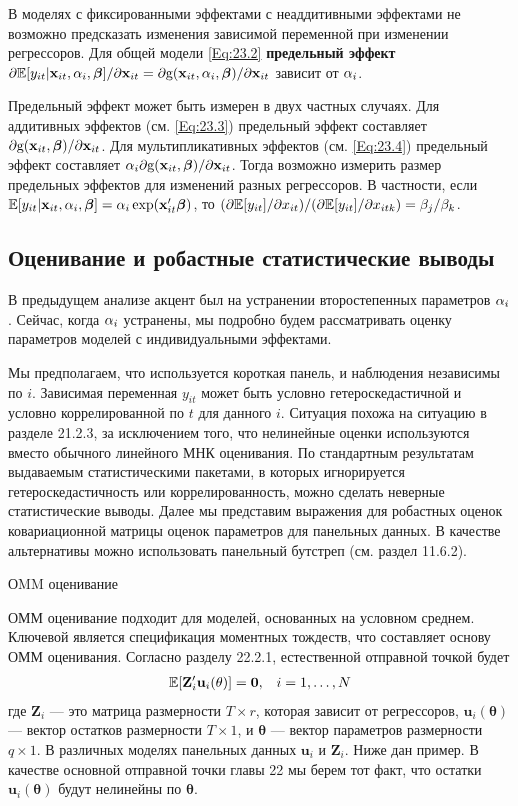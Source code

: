 В моделях с фиксированными эффектами с неаддитивными эффектами  не возможно предсказать изменения зависимой переменной при изменении регрессоров. Для общей модели \ref{Eq:23.2} \textbf{предельный эффект} $\partial \mathbb{E}[y_{it}|\mathbf{x}_{it},\alpha_i,\bm{\beta}]/\partial \mathbf{x}_{it} = \partial \mathrm g(\mathbf{x}_{it}, \alpha_i, \bm{\beta})/\partial\mathbf{x}_{it}$ зависит от $\alpha_i$.

Предельный эффект может быть измерен в двух частных случаях. Для аддитивных эффектов (см. \ref{Eq:23.3}) предельный эффект составляет $\partial \mathrm g(\mathbf{x}_{it}, \bm{\beta})/\partial \mathbf{x}_{it}$. Для мультипликативных эффектов (см. \ref{Eq:23.4}) предельный эффект составляет $\alpha_i \partial \mathrm g(\mathbf{x}_{it}, \bm{\beta})/\partial \mathbf{x}_{it}$. Тогда возможно измерить размер предельных эффектов для изменений разных регрессоров. В частности, если $\mathbb{E} [y_{it}|\mathbf{x}_{it}, \alpha_i, \bm{\beta}]=\alpha_i \exp (\mathbf{x}_{it}' \bm{\beta})$, то $(\partial \mathbb{E}[y_{it}]/\partial x_{it})/(\partial \mathbb{E}[y_{it}]/\partial x_{itk}) = \beta_j/\beta_k$.

\subsection{Оценивание и робастные статистические выводы}

В предыдущем анализе акцент был на устранении второстепенных параметров $\alpha_i$. Сейчас, когда $\alpha_i$ устранены, мы подробно будем рассматривать оценку параметров моделей с индивидуальными эффектами.

Мы предполагаем, что используется короткая панель, и наблюдения независимы по $i$.
Зависимая переменная $y_{it}$ может быть условно гетероскедастичной и условно коррелированной по $t$ для данного $i$. Ситуация похожа на ситуацию в разделе 21.2.3, за исключением того, что нелинейные оценки используются вместо обычного линейного МНК оценивания. По стандартным результатам выдаваемым статистическими пакетами, в которых игнорируется гетероскедастичность или коррелированность, можно сделать неверные статистические выводы. Далее мы представим выражения для робастных оценок ковариационной матрицы оценок параметров для панельных данных. В качестве альтернативы можно использовать панельный бутстреп (см. раздел 11.6.2).

{\centering ОMM оценивание \\}

ОММ оценивание подходит для моделей, основанных на условном среднем. Ключевой является спецификация моментных тождеств, что составляет основу ОММ оценивания. Согласно разделу 22.2.1, естественной отправной точкой будет
\begin{align}
&\mathbb{E}[\mathbf{Z}'_i \mathbf{u}_i (\mathbf{\theta})]=\mathbf{0},
&i=1, \dots, N
\label{Eq:23.24}
\end{align}
где $\mathbf{Z}_i$ --- это матрица размерности $T \times r$, которая зависит от регрессоров, $\mathbf{u}_i(\mathbf{\theta})$ --- вектор остатков размерности $T \times 1$, и $\mathbf{\theta}$ --- вектор параметров размерности  $q \times 1$. В различных моделях панельных данных $\mathbf{u}_i$ и $\mathbf{Z}_i$. Ниже дан пример. В качестве основной отправной точки главы 22 мы берем тот факт, что остатки $\mathbf{u}_i(\mathbf{\bm\theta})$ будут нелинейны по $\bm\theta$.


